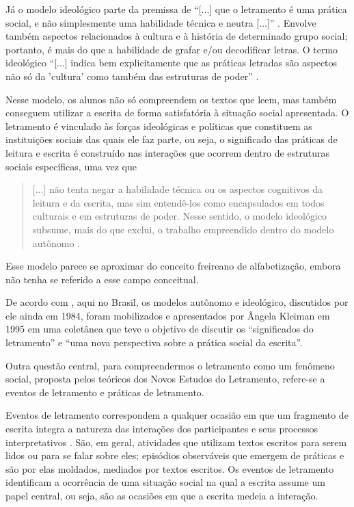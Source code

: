 \documentclass{textolivre}
\begin{document}
Já o modelo ideológico parte da premissa de “[...] que o letramento é uma
prática social, e não simplesmente uma habilidade técnica e neutra [...]”
\textcite[p. 53]{street2014}. Envolve também aspectos relacionados à cultura e à
história de determinado grupo social; portanto, é mais do que a habilidade de
grafar e/ou decodificar letras. O termo ideológico “[...] indica bem
explicitamente que as práticas letradas são aspectos não só da ’cultura’ como
também das estruturas de poder” \cite[p. 172]{street2014}.

Nesse modelo, os alunos não só compreendem os textos que leem, mas também
conseguem utilizar a escrita de forma satisfatória à situação social
apresentada. O letramento é vinculado às forças ideológicas e políticas que
constituem as instituições sociais das quais ele faz parte, ou seja, o
significado das práticas de leitura e escrita é construído nas interações que
ocorrem dentro de estruturas sociais específicas, uma vez que
\begin{quote}
[...] não tenta negar a habilidade técnica ou os aspectos cognitivos da leitura
e da escrita, mas sim entendê-los como encapsulados em todos culturais e em
estruturas de poder. Nesse sentido, o modelo ideológico subsume, mais do que
exclui, o trabalho empreendido dentro do modelo autônomo \cite[p. 172]{street2014}.
\end{quote}

Esse modelo parece se aproximar do conceito freireano de alfabetização, embora
\textcite{street2014} não tenha se referido a esse campo conceitual.

De acordo com \textcite{street2014}, aqui no Brasil, os modelos autônomo e
ideológico, discutidos por ele ainda em 1984, foram mobilizados e apresentados
por Ângela Kleiman em 1995 em uma coletânea que teve o objetivo de discutir os
“significados do letramento” e “uma nova perspectiva sobre a prática social da
escrita”.

Outra questão central, para compreendermos o letramento como um fenômeno social, 
proposta pelos teóricos dos Novos Estudos do Letramento, refere-se a eventos de
letramento e práticas de letramento.

Eventos de letramento correspondem a qualquer ocasião em que um fragmento de
escrita integra a natureza das interações dos participantes e seus processos
interpretativos \cite{street2014}. São, em geral, atividades que utilizam textos
escritos para serem lidos ou para se falar sobre eles; episódios observáveis
que emergem de práticas e são por elas moldados, mediados por textos escritos.
Os eventos de letramento identificam a ocorrência de uma situação social na
qual a escrita assume um papel central, ou seja, são as ocasiões em que a
escrita medeia a interação.
\end{document}
